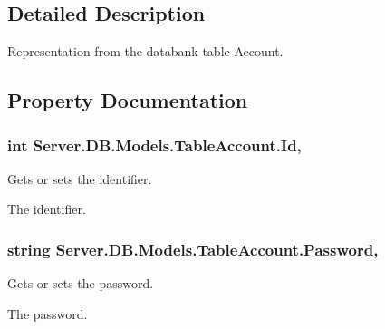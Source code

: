 \subsection{Detailed Description}
Representation from the databank table Account. 



\subsection{Property Documentation}
\hypertarget{classServer_1_1DB_1_1Models_1_1TableAccount_a2bc49cfaddd688fde3be961d9491bdae}{}
\subsubsection[{Id}]{\setlength{\rightskip}{0pt plus 5cm}int Server.\+D\+B.\+Models.\+Table\+Account.\+Id\hspace{0.3cm}{\ttfamily [get]}, {\ttfamily [set]}}\label{classServer_1_1DB_1_1Models_1_1TableAccount_a2bc49cfaddd688fde3be961d9491bdae}


Gets or sets the identifier. 

The identifier.\hypertarget{classServer_1_1DB_1_1Models_1_1TableAccount_ae2e067ab09522520d715b4cf51386cd9}{}
\subsubsection[{Password}]{\setlength{\rightskip}{0pt plus 5cm}string Server.\+D\+B.\+Models.\+Table\+Account.\+Password\hspace{0.3cm}{\ttfamily [get]}, {\ttfamily [set]}}\label{classServer_1_1DB_1_1Models_1_1TableAccount_ae2e067ab09522520d715b4cf51386cd9}


Gets or sets the password. 

The password.\hypertarget{classServer_1_1DB_1_1Models_1_1TableAccount_a5d4782aec9c4515ec3158831df9048af}{}
